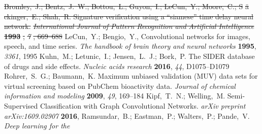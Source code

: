 \documentclass[journal=jcisd8,manuscript=article]{achemso} %
\providecommand{\DIFdel}[1]{{\protect\color{red}\sout{#1}}}                      %
\providecommand{\DIFdelbegin}{} %
\providecommand{\DIFdelend}{} %
\begin{document}
\begin{mcitethebibliography}{34}
\EndOfBibitem
\DIFdelbegin {}
\DIFdel{Bromley,~J.; Bentz,~J.~W.; Bottou,~L.; Guyon,~I.; LeCun,~Y.; Moore,~C.;
  S}%
\DIFdel{\"a}%
\DIFdel{ckinger,~E.; Shah,~R. Signature verification using a “siamese” time
  delay neural network. }\emph{\DIFdel{International Journal of Pattern Recognition and
  Artificial Intelligence}} %
\textbf{\DIFdel{1993}}%
\DIFdel{, }\emph{\DIFdel{7}}%
\DIFdel{, 669--688}%
\DIFdelend {}
LeCun,~Y.; Bengio,~Y.,   Convolutional networks for images,
  speech, and time series. \emph{The handbook of brain theory and neural
  networks} \textbf{1995}, \emph{3361}, 1995\relax
\mciteBstWouldAddEndPuncttrue
\mciteSetBstMidEndSepPunct{\mcitedefaultmidpunct}
{\mcitedefaultendpunct}{\mcitedefaultseppunct}\relax
\EndOfBibitem
{}
Kuhn,~M.; Letunic,~I.; Jensen,~L.~J.; Bork,~P. The SIDER database of drugs and
  side effects. \emph{Nucleic acids research} \textbf{2016}, \emph{44},
  D1075--D1079\relax
\mciteBstWouldAddEndPuncttrue
\mciteSetBstMidEndSepPunct{\mcitedefaultmidpunct}
{\mcitedefaultendpunct}{\mcitedefaultseppunct}\relax
\EndOfBibitem
{}
Rohrer,~S.~G.; Baumann,~K. Maximum unbiased validation (MUV) data sets for
  virtual screening based on PubChem bioactivity data. \emph{Journal of
  chemical information and modeling} \textbf{2009}, \emph{49}, 169--184\relax
\mciteBstWouldAddEndPuncttrue
\mciteSetBstMidEndSepPunct{\mcitedefaultmidpunct}
{\mcitedefaultendpunct}{\mcitedefaultseppunct}\relax
\EndOfBibitem
{}
Kipf,~T.~N.; Welling,~M. Semi-Supervised Classification with Graph
  Convolutional Networks. \emph{arXiv preprint arXiv:1609.02907} \textbf{2016},
  \relax
\mciteBstWouldAddEndPunctfalse
\mciteSetBstMidEndSepPunct{\mcitedefaultmidpunct}
{}{\mcitedefaultseppunct}\relax
\EndOfBibitem
{}
Ramsundar,~B.; Eastman,~P.; Walters,~P.; Pande,~V. \emph{Deep learning for the
}
\end{mcitethebibliography}
\end{document}

